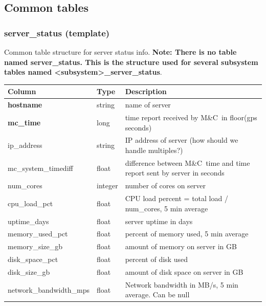 \documentclass{article}
\newcommand{\mc}{M\&C}
\begin{document}
{\subsection{Common tables}
\subsubsection{server\_status (template)}
\label{sec:server_status}
Common table structure for server status info. \textbf{Note: There is no table named server\_status. This is the structure used for several subsystem tables named \textless subsystem\textgreater\_server\_status}.
\begin{center}
 \begin{tabular}{| p{4cm} | p{2cm} | p{10cm} |}
\hline
 {\bf Column} & {\bf Type}  & {\bf Description} \\ [0.5ex]  \hline\hline
 \textbf{hostname} & string &  name of server \\ \hline
 \textbf{mc\_time} & long & time report received by \mc\ in floor(gps seconds) \\ \hline
 ip\_address & string & IP address of server (how should we handle multiples?) \\\hline
mc\_system\_timediff & float & difference between \mc\ time and time report sent by server in seconds \\\hline
num\_cores & integer & number of cores on server \\\hline
cpu\_load\_pct & float & CPU load percent = total load / num\_cores, 5 min average  \\\hline
uptime\_days & float & server uptime in days  \\\hline
memory\_used\_pct & float & percent of memory used, 5 min average  \\\hline
memory\_size\_gb & float & amount of memory on server in GB \\\hline
disk\_space\_pct & float & percent of disk used  \\\hline
disk\_size\_gb & float & amount of disk space on server in GB \\\hline
network\_bandwidth\_mps & float & Network bandwidth in MB/s, 5 min average. Can be null \\\hline
\end{tabular}
\end{center}

}
\end{document}
